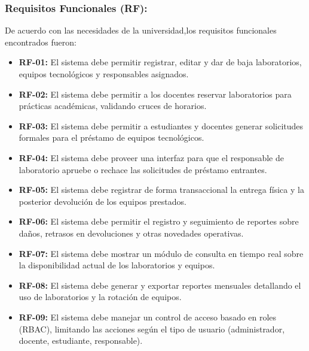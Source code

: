 \documentclass[pdflatex,sn-mathphys-num]{sn-jnl}%
\theoremstyle{thmstyleone}%
\theoremstyle{thmstyletwo}%
\theoremstyle{thmstylethree}%
\begin{document}
\subsubsection{Requisitos Funcionales (RF):}
De acuerdo con las necesidades de la universidad,los requisitos funcionales encontrados fueron:
\begin{itemize}
	\item \textbf{RF-01:} El sistema debe permitir registrar, editar y dar de baja laboratorios, equipos tecnológicos y responsables asignados.
	\item \textbf{RF-02:} El sistema debe permitir a los docentes reservar laboratorios para prácticas académicas, validando cruces de horarios.
	\item \textbf{RF-03:} El sistema debe permitir a estudiantes y docentes generar solicitudes formales para el préstamo de equipos tecnológicos.
	\item \textbf{RF-04:} El sistema debe proveer una interfaz para que el responsable de laboratorio apruebe o rechace las solicitudes de préstamo entrantes.
	\item \textbf{RF-05:} El sistema debe registrar de forma transaccional la entrega física y la posterior devolución de los equipos prestados.
	\item \textbf{RF-06:} El sistema debe permitir el registro y seguimiento de reportes sobre daños, retrasos en devoluciones y otras novedades operativas.
	\item \textbf{RF-07:} El sistema debe mostrar un módulo de consulta en tiempo real sobre la disponibilidad actual de los laboratorios y equipos.
	\item \textbf{RF-08:} El sistema debe generar y exportar reportes mensuales detallando el uso de laboratorios y la rotación de equipos.
	\item \textbf{RF-09:} El sistema debe manejar un control de acceso basado en roles (RBAC), limitando las acciones según el tipo de usuario (administrador, docente, estudiante, responsable).
\end{itemize}
\end{document}

